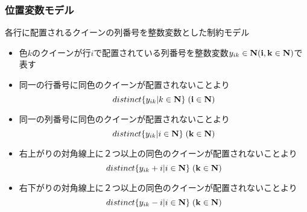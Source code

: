 \documentclass [dvipdfmx,11pt]{beamer}
\begin{document}
\begin{frame}
    \frametitle{位置変数モデル}
    
    {\small
        各行に配置される\alert{クイーンの列番号}を整数変数とした制約モデル
    }
    {\footnotesize
        \setlength{\abovedisplayskip}{1pt} %
        \setlength{\belowdisplayskip}{0pt} %
        \begin{block}{}
            \setlength{\itemsep}{0pt}
            \setlength{\parskip}{0pt}
            \begin{itemize}
                \item 色$k$のクイーンが行$i$で配置されている列番号を整数変数$y_{ik} \in \bf N (i, k \in \bf N)$で表す
                \item 同一の\alert{行番号}に同色のクイーンが配置されないことより
                    $$distinct\{y_{ik} | k \in \bf N\} \; (i \in \bf N)$$
                \item 同一の\alert{列番号}に同色のクイーンが配置されないことより
                    $$distinct\{y_{ik} | i \in \bf N\} \; (k \in \bf N)$$
                \item \alert{右上がりの対角線上}に２つ以上の同色のクイーンが配置されないことより
                    $$distinct\{y_{ik}+i | i \in \bf N\} \; (k \in \bf N)$$
                \item \alert{右下がりの対角線上}に２つ以上の同色のクイーンが配置されないことより
                    $$distinct\{y_{ik}-i | i \in \bf N\} \; (k \in \bf N)$$
            \end{itemize}
        \end{block}
    }
\end{frame}
\end{document}
